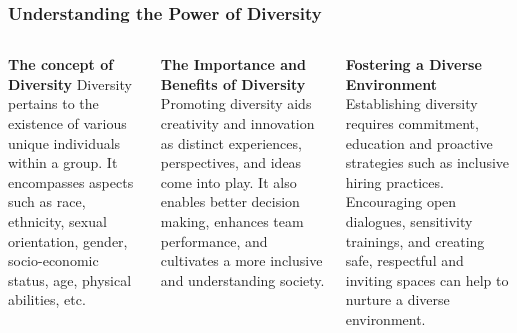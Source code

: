 \documentclass[5pt]{beamer}
\begin{document}
\begin{frame}
\frametitle{Understanding the Power of Diversity}
\begin{columns}
\begin{column}{0.3\textwidth}
\begin{block}{\textbf{The concept of Diversity}}
Diversity pertains to the existence of various unique individuals within a group. It encompasses aspects such as race, ethnicity, sexual orientation, gender, socio-economic status, age, physical abilities, etc.
\end{block}
\end{column}
\begin{column}{0.3\textwidth}
\begin{block}{\textbf{The Importance and Benefits of Diversity}}
Promoting diversity aids creativity and innovation as distinct experiences, perspectives, and ideas come into play. It also enables better decision making, enhances team performance, and cultivates a more inclusive and understanding society.
\end{block}
\end{column}
\begin{column}{0.3\textwidth}
\begin{block}{\textbf{Fostering a Diverse Environment}}
Establishing diversity requires commitment, education and proactive strategies such as inclusive hiring practices. Encouraging open dialogues, sensitivity trainings, and creating safe, respectful and inviting spaces can help to nurture a diverse environment.
\end{block}
\end{column}
\end{columns}
\end{frame}
\end{document}
